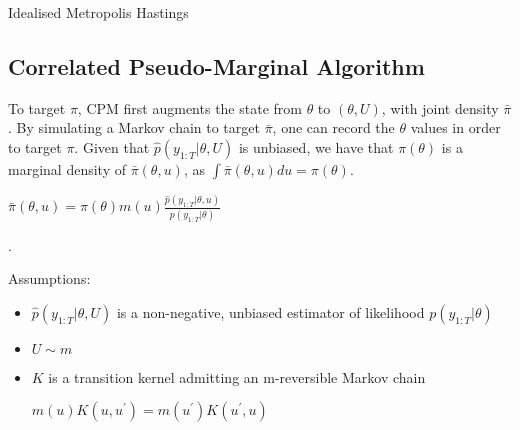 \documentclass{article}
\makeatletter
\def\BState{\State\hskip-\ALG@thistlm}
\makeatother
\begin{document}
\begin{algorithm}[H]
\caption{Idealised Metropolis Hastings}\label{euclid}
\end{algorithm}


\subsection{Correlated Pseudo-Marginal Algorithm}
To target $\pi$, CPM first augments the state from $\theta$ to $(\theta, U)$, with joint density $\bar{\pi}$. By simulating a Markov chain to target $\bar{\pi}$, one can record the $\theta$ values in order to target $\pi$. Given that $\hat{p} (y_{1:T} | \theta, U)$ is unbiased, we have that $\pi(\theta)$ is a marginal density of $\bar{\pi} (\theta, u)$, as $\int \bar{\pi}(\theta,u)du = \pi(\theta)$. \\

\centerline{$\bar{\pi}(\theta, u) = \pi(\theta)m(u)\frac{\hat{p}(y_{1:T}| \theta, u)}{p(y_{1:T}| \theta)}$}.

Assumptions:
\begin{itemize}
 \item $\hat{p}(y_{1:T}| \theta, U)$ is a non-negative, unbiased estimator of likelihood $p(y_{1:T}| \theta)$
 \item $U \sim m$
 \item $K$ is a transition kernel admitting an m-reversible Markov chain \newline
\centerline{$ m(u)K(u,u^\prime) = m(u^\prime)K(u^\prime, u)$} \newline
\end{itemize}
\end{document}
